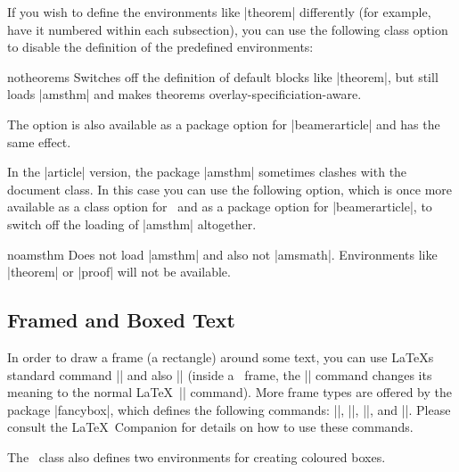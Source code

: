 If you wish to define the environments like |theorem| differently (for
example, have it numbered within each subsection), you can use the
following class option to disable the definition of the predefined
environments: 

\begin{classoption}{notheorems}
  Switches off the definition of default blocks like |theorem|, but
  still loads |amsthm| and makes theorems  
  overlay-specificiation-aware.
\end{classoption}

The option is also available as a package option for
|beamerarticle| and has the same effect.

\articlenote
In the |article| version, the package |amsthm| sometimes clashes with
the document class. In this case you can use the following option,
which is once more available as a class option for \beamer\ and as a
package option for |beamerarticle|, to switch off the loading of
|amsthm| altogether. 

\begin{classoption}{noamsthm}
  Does not load |amsthm| and also not |amsmath|. Environments like
  |theorem| or |proof| will not be available.
\end{classoption}




\subsection{Framed and Boxed Text}

In order to draw a frame (a rectangle) around some text, you can use
\LaTeX s standard command |\fbox| and also |\frame| (inside a \beamer{}, the |\frame| command changes its meaning to the normal \LaTeX\
|\frame| command). More frame types are offered by the
package |fancybox|, which defines the following commands:
|\shadowbox|, |\doublebox|, |\ovalbox|, and |\Ovalbox|. Please consult
the \LaTeX\ Companion for details on how to use these commands.

The \beamer\ class also defines two environments for creating coloured
boxes.

